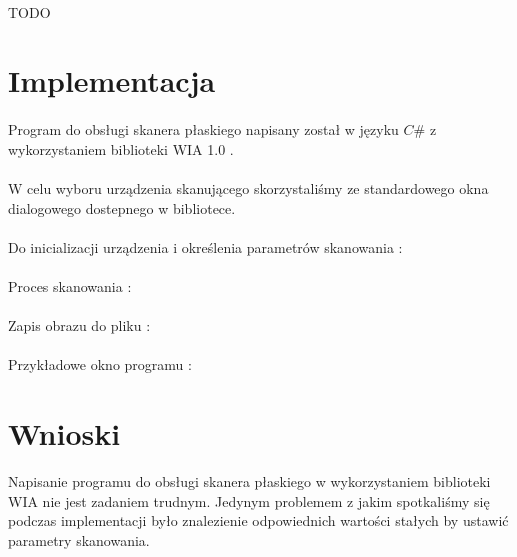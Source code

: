 \documentclass[wide,a4paper,titlepage,12pt] {article}
\begin{document}
\paragraph{} %
\label{par:}
TODO

\section{Implementacja}
\paragraph{} %
\label{par:}
Program do obsługi skanera płaskiego napisany został w języku $C\#$ z wykorzystaniem biblioteki WIA 1.0 .

\paragraph{} %
\label{}
W celu wyboru urządzenia skanującego skorzystaliśmy ze standardowego okna dialogowego dostepnego w bibliotece.


\paragraph{}
Do inicializacji urządzenia i określenia parametrów skanowania : 

\paragraph{} %
\label{par:}
Proces skanowania :

\paragraph{} %
\label{par:}
Zapis obrazu do pliku :

\paragraph{} %
\label{par:}
Przykładowe okno programu :


\section{Wnioski}
Napisanie programu do obsługi skanera płaskiego w wykorzystaniem biblioteki WIA nie jest zadaniem trudnym. Jedynym problemem z jakim spotkaliśmy się podczas implementacji było znalezienie odpowiednich wartości stałych by ustawić parametry skanowania.
\paragraph{}
\end{document}
